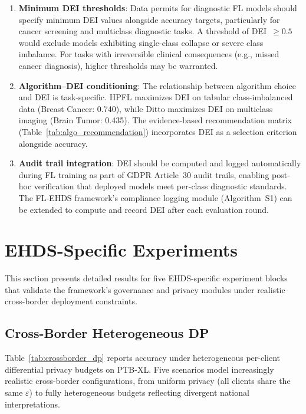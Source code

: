 \documentclass[conference]{IEEEtran}
\begin{document}
\begin{enumerate}
    \item \textbf{Minimum DEI thresholds}: Data permits for diagnostic FL models should specify minimum DEI values alongside accuracy targets, particularly for cancer screening and multiclass diagnostic tasks. A threshold of DEI~$\geq 0.5$ would exclude models exhibiting single-class collapse or severe class imbalance. For tasks with irreversible clinical consequences (e.g., missed cancer diagnosis), higher thresholds may be warranted.
    \item \textbf{Algorithm--DEI conditioning}: The relationship between algorithm choice and DEI is task-specific. HPFL maximizes DEI on tabular class-imbalanced data (Breast Cancer: 0.740), while Ditto maximizes DEI on multiclass imaging (Brain Tumor: 0.435). The evidence-based recommendation matrix (Table~\ref{tab:algo_recommendation}) incorporates DEI as a selection criterion alongside accuracy.
    \item \textbf{Audit trail integration}: DEI should be computed and logged automatically during FL training as part of GDPR Article~30 audit trails, enabling post-hoc verification that deployed models meet per-class diagnostic standards. The FL-EHDS framework's compliance logging module (Algorithm~S1) can be extended to compute and record DEI after each evaluation round.
\end{enumerate}

\section{EHDS-Specific Experiments}
\label{sec:ehds_experiments}

This section presents detailed results for five EHDS-specific experiment blocks that validate the framework's governance and privacy modules under realistic cross-border deployment constraints.

\subsection{Cross-Border Heterogeneous DP}
\label{sec:crossborder_dp}

Table~\ref{tab:crossborder_dp} reports accuracy under heterogeneous per-client differential privacy budgets on PTB-XL. Five scenarios model increasingly realistic cross-border configurations, from uniform privacy (all clients share the same $\varepsilon$) to fully heterogeneous budgets reflecting divergent national interpretations.
\end{document}
